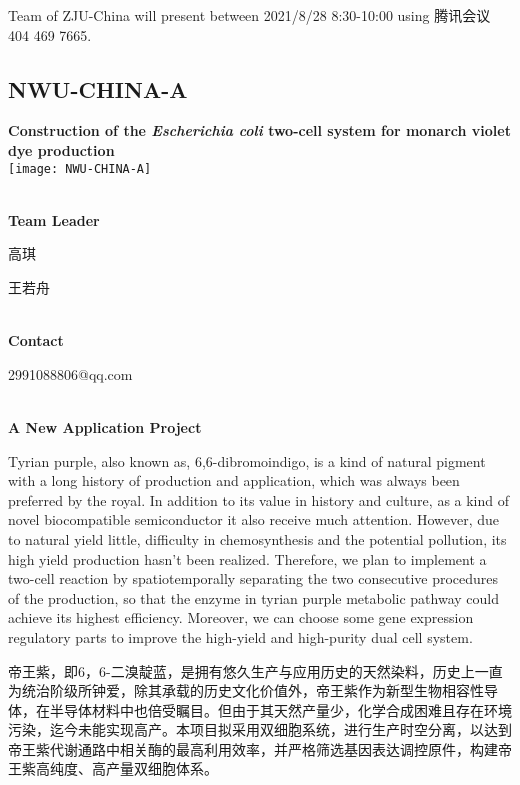 \vfill{}









Team of ZJU-China will present between    2021/8/28 8:30-10:00     using 腾讯会议 404 469 7665.
\newpage


\subsection{\textcolor{Blu}{ NWU-CHINA-A } }
\vspace{5mm}
\begin{center}
\large{
  \textbf{ Construction of the \textit{Escherichia coli} two-cell system for monarch violet dye production }\\

  \texttt{[image: NWU-CHINA-A]}
}
\end{center}
\textbf{\\Team Leader}

  高琪

  王若舟


\textbf{\\Contact}

  2991088806@qq.com


\textbf{\\A New Application Project\\}\begin{spacing}{1.5}

Tyrian purple, also known as, 6,6-dibromoindigo, is a kind of natural pigment with a long history of production and application, which was always been preferred by the royal. In addition to its value in history and culture, as a kind of novel biocompatible semiconductor it also receive much attention. However, due to natural yield little, difficulty in chemosynthesis and the potential pollution, its high yield production hasn’t been realized. Therefore, we plan to implement a two-cell reaction by spatiotemporally separating the two consecutive procedures of the production, so that the enzyme in tyrian purple metabolic pathway could achieve its highest efficiency. Moreover, we can choose some gene expression regulatory parts to improve the high-yield and high-purity dual cell system.

帝王紫，即6，6-二溴靛蓝，是拥有悠久生产与应用历史的天然染料，历史上一直为统治阶级所钟爱，除其承载的历史文化价值外，帝王紫作为新型生物相容性导体，在半导体材料中也倍受瞩目。但由于其天然产量少，化学合成困难且存在环境污染，迄今未能实现高产。本项目拟采用双细胞系统，进行生产时空分离，以达到帝王紫代谢通路中相关酶的最高利用效率，并严格筛选基因表达调控原件，构建帝王紫高纯度、高产量双细胞体系。\end{spacing}
\\

